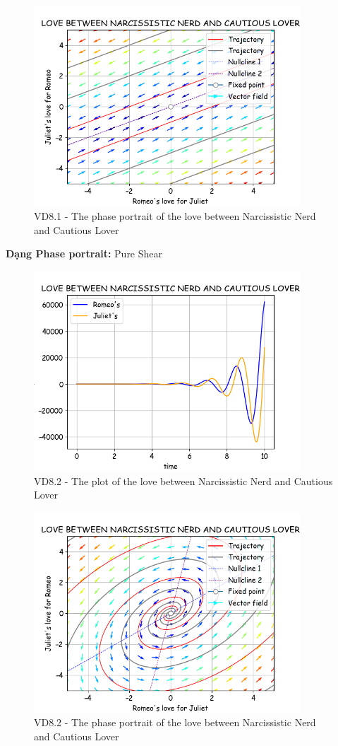 \begin{figure}[!htbp]
    \centering
    \includegraphics[width=100mm]{image/bt2/pp8.1.png}
    \caption{VD8.1 - The phase portrait of the love between Narcissistic Nerd and Cautious Lover}
\end{figure}

\textbf{Dạng Phase portrait: } Pure Shear
\pagebreak
\begin{figure}[!htbp]
    \centering
    \includegraphics[width=100mm]{image/bt2/plot8.2.png}
    \caption{VD8.2 - The plot of the love between Narcissistic Nerd and Cautious Lover}
\end{figure}
\begin{figure}[!htbp]
    \centering
    \includegraphics[width=100mm]{image/bt2/pp8.2.png}
    \caption{VD8.2 - The phase portrait of the love between Narcissistic Nerd and Cautious Lover}
\end{figure}

